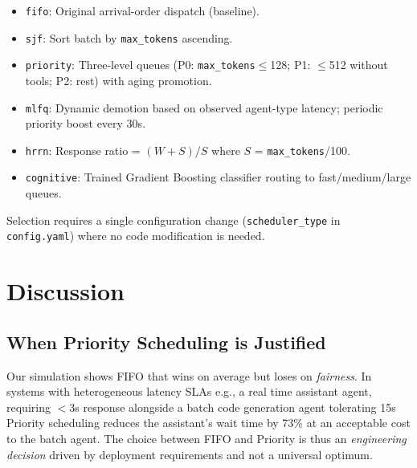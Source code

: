 \documentclass[conference]{IEEEtran}
\begin{document}
\begin{itemize}
    \item \texttt{fifo}: Original arrival-order dispatch (baseline).
    \item \texttt{sjf}: Sort batch by \texttt{max\_tokens} ascending.
    \item \texttt{priority}: Three-level queues (P0: \texttt{max\_tokens}$\leq$128; P1: $\leq$512 without tools; P2: rest) with aging promotion.
    \item \texttt{mlfq}: Dynamic demotion based on observed agent-type latency; periodic priority boost every 30s.
    \item \texttt{hrrn}: Response ratio = $(W + S)/S$ where $S$ = \texttt{max\_tokens}/100.
    \item \texttt{cognitive}: Trained Gradient Boosting classifier routing to fast/medium/large queues.
\end{itemize}

Selection requires a single configuration change (\texttt{scheduler\_type} in \texttt{config.yaml}) where no code modification is needed.

\section{Discussion}

\subsection{When Priority Scheduling is Justified}
Our simulation shows FIFO that wins on average but loses on \textit{fairness}. In systems with heterogeneous latency SLAs e.g., a real time assistant agent, requiring $<$3s response alongside a batch code generation agent tolerating 15s Priority scheduling reduces the assistant's wait time by 73\% at an acceptable cost to the batch agent. The choice between FIFO and Priority is thus an \textit{engineering decision} driven by deployment requirements and not a universal optimum.
\end{document}
